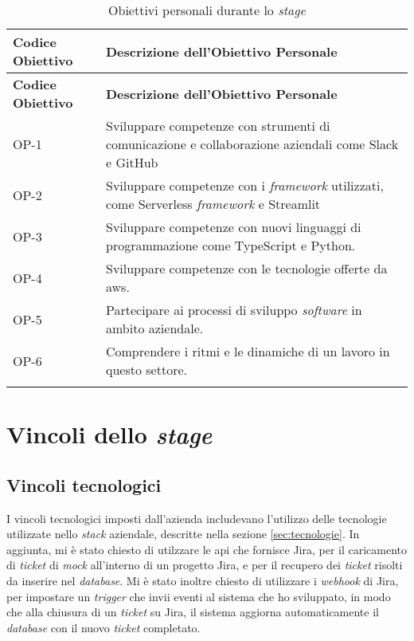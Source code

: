 \renewcommand{\arraystretch}{2}
\begin{longtable}{|p{2cm}|p{9cm}|}
    \hline
    \rowcolor{tableheader}\textbf{Codice Obiettivo} & \textbf{Descrizione dell'Obiettivo Personale} \\
    \hline
    \endfirsthead

    \rowcolor{tableheader}\textbf{Codice Obiettivo} & \textbf{Descrizione dell'Obiettivo Personale} \\
    \hline
    \endhead

    \hline
    \endfoot

    \hline
    \endlastfoot
    \rowcolor{tableoddrow} OP-1 & Sviluppare competenze con strumenti di comunicazione e collaborazione aziendali come Slack e GitHub \\
    \hline
    \rowcolor{tableevenrow} OP-2 & Sviluppare competenze con i \textit{framework} utilizzati, come Serverless \textit{framework} e Streamlit \\
    \hline
    \rowcolor{tableoddrow} OP-3 & Sviluppare competenze con nuovi linguaggi di programmazione come TypeScript e Python. \\
    \hline
    \rowcolor{tableevenrow} OP-4 & Sviluppare competenze con le tecnologie offerte da \gls{aws}. \\
    \hline
    \rowcolor{tableoddrow} OP-5 & Partecipare ai processi di sviluppo \textit{software} in ambito aziendale. \\
    \hline
    \rowcolor{tableevenrow} OP-6 & Comprendere i ritmi e le dinamiche di un lavoro in questo settore. \\
    \hline
    \caption{Obiettivi personali durante lo \textit{stage}}
    \label{tab:obiettiviPersonali}
\end{longtable}
\section{Vincoli dello \textit{stage}}
\subsection{Vincoli tecnologici}
I vincoli tecnologici imposti dall'azienda includevano l'utilizzo delle tecnologie utilizzate nello \textit{stack} aziendale, descritte nella sezione \ref{sec:tecnologie}. 
In aggiunta, mi è stato chiesto di utilzzare le \gls{api} che fornisce Jira, per il caricamento di \textit{ticket} di \textit{mock} all'interno di un progetto Jira, e per il recupero dei \textit{ticket} risolti da inserire nel \textit{database}.
Mi è stato inoltre chiesto di utilizzare i \textit{webhook} di Jira, per impostare un \textit{trigger} che invii eventi al sistema che ho sviluppato, in modo che alla chiusura di un \textit{ticket} su Jira, il sistema aggiorna automaticamente il \textit{database} con il nuovo \textit{ticket} completato.
